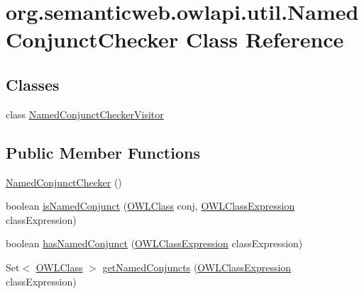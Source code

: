 \hypertarget{classorg_1_1semanticweb_1_1owlapi_1_1util_1_1_named_conjunct_checker}{\section{org.\-semanticweb.\-owlapi.\-util.\-Named\-Conjunct\-Checker Class Reference}
\label{classorg_1_1semanticweb_1_1owlapi_1_1util_1_1_named_conjunct_checker}
}
\subsection*{Classes}
\begin{DoxyCompactItemize}
\item 
class \hyperlink{classorg_1_1semanticweb_1_1owlapi_1_1util_1_1_named_conjunct_checker_1_1_named_conjunct_checker_visitor}{Named\-Conjunct\-Checker\-Visitor}
\end{DoxyCompactItemize}
\subsection*{Public Member Functions}
\begin{DoxyCompactItemize}
\item 
\hyperlink{classorg_1_1semanticweb_1_1owlapi_1_1util_1_1_named_conjunct_checker_a8b5476202bd5201f15b7700ebb979bf1}{Named\-Conjunct\-Checker} ()
\item 
boolean \hyperlink{classorg_1_1semanticweb_1_1owlapi_1_1util_1_1_named_conjunct_checker_a8b97de28b5b5570930a632abc1b8dbb2}{is\-Named\-Conjunct} (\hyperlink{interfaceorg_1_1semanticweb_1_1owlapi_1_1model_1_1_o_w_l_class}{O\-W\-L\-Class} conj, \hyperlink{interfaceorg_1_1semanticweb_1_1owlapi_1_1model_1_1_o_w_l_class_expression}{O\-W\-L\-Class\-Expression} class\-Expression)
\item 
boolean \hyperlink{classorg_1_1semanticweb_1_1owlapi_1_1util_1_1_named_conjunct_checker_ab2e1e150717ce5acf038a09808fe2ff7}{has\-Named\-Conjunct} (\hyperlink{interfaceorg_1_1semanticweb_1_1owlapi_1_1model_1_1_o_w_l_class_expression}{O\-W\-L\-Class\-Expression} class\-Expression)
\item 
Set$<$ \hyperlink{interfaceorg_1_1semanticweb_1_1owlapi_1_1model_1_1_o_w_l_class}{O\-W\-L\-Class} $>$ \hyperlink{classorg_1_1semanticweb_1_1owlapi_1_1util_1_1_named_conjunct_checker_a1db029799c079c1e0b4148b8b5f46fdd}{get\-Named\-Conjuncts} (\hyperlink{interfaceorg_1_1semanticweb_1_1owlapi_1_1model_1_1_o_w_l_class_expression}{O\-W\-L\-Class\-Expression} class\-Expression)
\end{DoxyCompactItemize}
